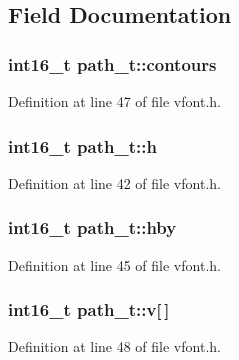 \subsection{Field Documentation}
\subsubsection[{\texorpdfstring{contours}{contours}}]{\setlength{\rightskip}{0pt plus 5cm}int16\+\_\+t path\+\_\+t\+::contours}\hypertarget{structpath__t_a9a9cee636fe5ce261fab53ef94064529}{}\label{structpath__t_a9a9cee636fe5ce261fab53ef94064529}


Definition at line 47 of file vfont.\+h.

\subsubsection[{\texorpdfstring{h}{h}}]{\setlength{\rightskip}{0pt plus 5cm}int16\+\_\+t path\+\_\+t\+::h}\hypertarget{structpath__t_a02d29349ef48169495440a754cad078f}{}\label{structpath__t_a02d29349ef48169495440a754cad078f}


Definition at line 42 of file vfont.\+h.

\subsubsection[{\texorpdfstring{hby}{hby}}]{\setlength{\rightskip}{0pt plus 5cm}int16\+\_\+t path\+\_\+t\+::hby}\hypertarget{structpath__t_ab2a7d0842a1706edb85f5bef4300a059}{}\label{structpath__t_ab2a7d0842a1706edb85f5bef4300a059}


Definition at line 45 of file vfont.\+h.

\subsubsection[{\texorpdfstring{v}{v}}]{\setlength{\rightskip}{0pt plus 5cm}int16\+\_\+t path\+\_\+t\+::v\mbox{[}$\,$\mbox{]}}\hypertarget{structpath__t_aea933e3d574931ef4c35386a2b2b8c03}{}\label{structpath__t_aea933e3d574931ef4c35386a2b2b8c03}


Definition at line 48 of file vfont.\+h.

